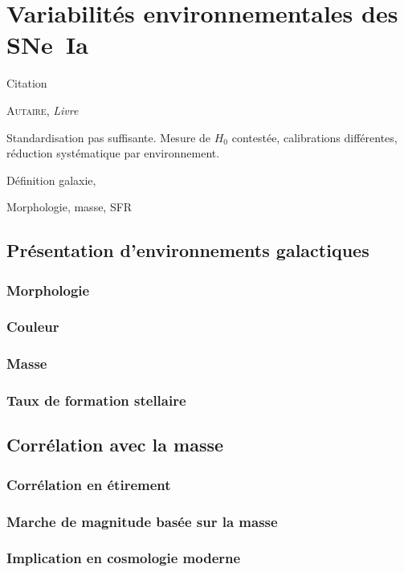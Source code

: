 \documentclass[../main/main.tex]{subfiles}
\begin{document}
\chapter{Variabilit\'es environnementales des SNe~Ia}\label{ch:sne}
\epigraph{\openquote Citation\closequote}{\textsc{Autaire}, \textit{Livre}}

Standardisation pas suffisante. Mesure de $H_0$ contestée, calibrations
différentes, réduction systématique par environnement.

Définition galaxie,

Morphologie, masse, SFR

\vfill
\minitoc
\vfill
\newpage

\section{Présentation d'environnements galactiques}\label{sec:envpres}
\subsection{Morphologie}\label{ssec:morphost}
\subsection{Couleur}\label{ssec:chost}
\subsection{Masse}\label{ssec:mhost}
\subsection{Taux de formation stellaire}\label{ssc:sfrhost}

\section{Corrélation avec la masse}\label{ssec:mcorr}
\subsection{Corrélation en étirement}\label{sssec:mcorrx1}
\subsection{Marche de magnitude basée sur la masse}\label{sssec:mstep}
\subsection{Implication en cosmologie moderne}\label{sssec:mcosmo}
\end{document}
